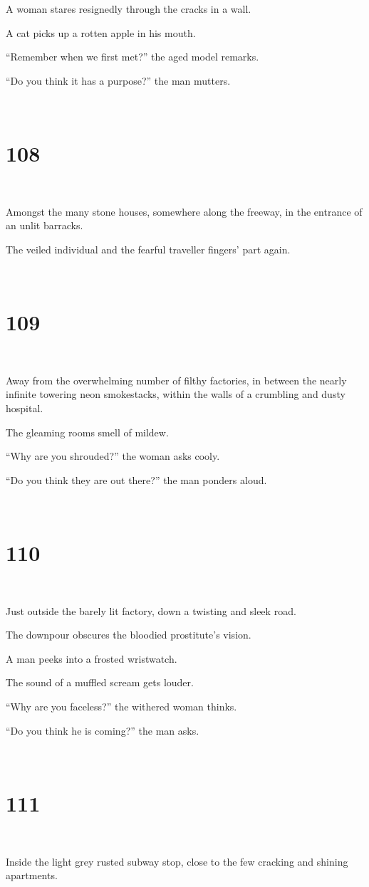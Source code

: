\documentclass{report}
\begin{document}
A woman stares resignedly through the cracks in a wall.

A cat picks up a rotten apple in his mouth.

``Remember when we first met?'' the aged model remarks.

``Do you think it has a purpose?'' the man mutters.

~
\chapter*{108}
~

Amongst the many stone houses, somewhere along the freeway, in the entrance of an unlit barracks.

The veiled individual and the fearful traveller fingers' part again.

~
\chapter*{109}
~

Away from the overwhelming number of filthy factories, in between the nearly infinite towering neon smokestacks, within the walls of a crumbling and dusty hospital.

The gleaming rooms smell of mildew.

``Why are you shrouded?'' the woman asks cooly.

``Do you think they are out there?'' the man ponders aloud.

~
\chapter*{110}
~

Just outside the barely lit factory, down a twisting and sleek road.

The downpour obscures the bloodied prostitute's vision.

A man peeks into a frosted wristwatch.

The sound of a muffled scream gets louder.

``Why are you faceless?'' the withered woman thinks.

``Do you think he is coming?'' the man asks.

~
\chapter*{111}
~

Inside the light grey rusted subway stop, close to the few cracking and shining apartments.
\end{document}
